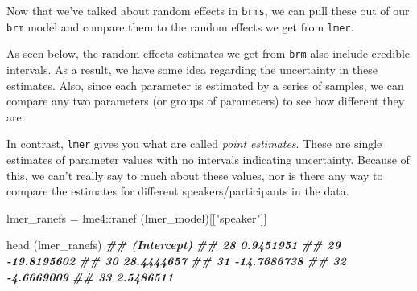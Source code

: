 \documentclass[
]{book}
\newenvironment{Shaded}{\begin{snugshade}}{\end{snugshade}}
\newcommand{\DocumentationTok}[1]{\textcolor[rgb]{0.56,0.35,0.01}{\textbf{\textit{#1}}}}
\newcommand{\FunctionTok}[1]{\textcolor[rgb]{0.00,0.00,0.00}{#1}}
\newcommand{\NormalTok}[1]{#1}
\newcommand{\OtherTok}[1]{\textcolor[rgb]{0.56,0.35,0.01}{#1}}
\newcommand{\SpecialCharTok}[1]{\textcolor[rgb]{0.00,0.00,0.00}{#1}}
\newcommand{\StringTok}[1]{\textcolor[rgb]{0.31,0.60,0.02}{#1}}
\begin{document}
Now that we've talked about random effects in \texttt{brms}, we can pull these out of our \texttt{brm} model and compare them to the random effects we get from \texttt{lmer}.

As seen below, the random effects estimates we get from \texttt{brm} also include credible intervals. As a result, we have some idea regarding the uncertainty in these estimates. Also, since each parameter is estimated by a series of samples, we can compare any two parameters (or groups of parameters) to see how different they are.

\begin{Shaded}
\end{Shaded}

In contrast, \texttt{lmer} gives you what are called \emph{point estimates}. These are single estimates of parameter values with no intervals indicating uncertainty. Because of this, we can't really say to much about these values, nor is there any way to compare the estimates for different speakers/participants in the data.

\begin{Shaded}
\begin{Highlighting}[]
\NormalTok{lmer\_ranefs }\OtherTok{=}\NormalTok{ lme4}\SpecialCharTok{::}\FunctionTok{ranef}\NormalTok{ (lmer\_model)[[}\StringTok{"speaker"}\NormalTok{]]}

\FunctionTok{head}\NormalTok{ (lmer\_ranefs)}
\DocumentationTok{\#\#    (Intercept)}
\DocumentationTok{\#\# 28   0.9451951}
\DocumentationTok{\#\# 29 {-}19.8195602}
\DocumentationTok{\#\# 30  28.4444657}
\DocumentationTok{\#\# 31 {-}14.7686738}
\DocumentationTok{\#\# 32  {-}4.6669009}
\DocumentationTok{\#\# 33   2.5486511}
\end{Highlighting}
\end{Shaded}
\end{document}

